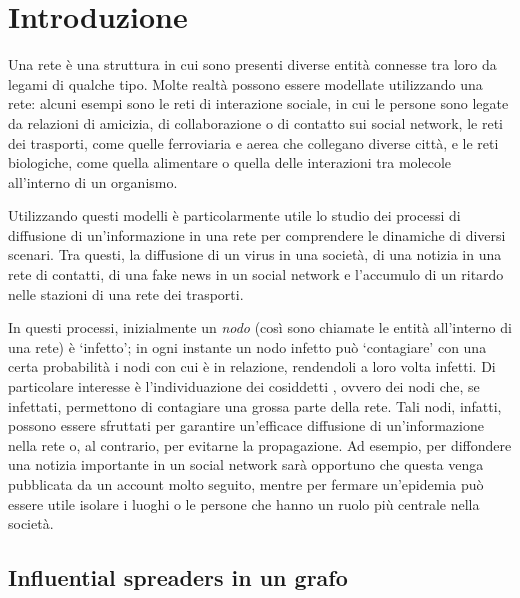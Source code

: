 \chapter{Introduzione}

Una rete è una struttura in cui sono presenti diverse entità connesse tra loro da legami 
di qualche tipo. Molte realtà possono essere modellate utilizzando una rete:
alcuni esempi sono le reti di interazione sociale, in cui le persone sono legate 
da relazioni di amicizia, di collaborazione o di contatto sui social network, 
le reti dei trasporti, come quelle ferroviaria e aerea
che collegano diverse città, e le reti biologiche, come quella alimentare o
quella delle interazioni tra molecole all'interno di un organismo.

Utilizzando questi modelli è particolarmente utile lo studio dei processi di diffusione
di un'informazione in una rete per comprendere le dinamiche di diversi scenari.
Tra questi, la diffusione di un virus in una società, di una notizia in una rete di contatti, 
di una fake news in un social network e l'accumulo di un ritardo nelle stazioni di una rete 
dei trasporti.

In questi processi, inizialmente un \emph{nodo} (così sono chiamate le entità all'interno di una rete) 
è `infetto'; in ogni instante un nodo infetto può `contagiare' con una certa probabilità i 
nodi con cui è in relazione, rendendoli a loro volta infetti.
Di particolare interesse è l'individuazione dei cosiddetti \infsp, ovvero dei nodi
che, se infettati, permettono di contagiare una grossa parte della rete.
Tali nodi, infatti, possono essere sfruttati per garantire un'efficace diffusione 
di un'informazione nella rete o, al contrario, per evitarne la propagazione.
Ad esempio, per diffondere una notizia importante in un social network sarà opportuno che 
questa venga pubblicata da un account molto seguito, mentre per fermare un'epidemia 
può essere utile isolare i luoghi o le persone che hanno un ruolo più centrale
nella società.


\section{Influential spreaders in un grafo}

